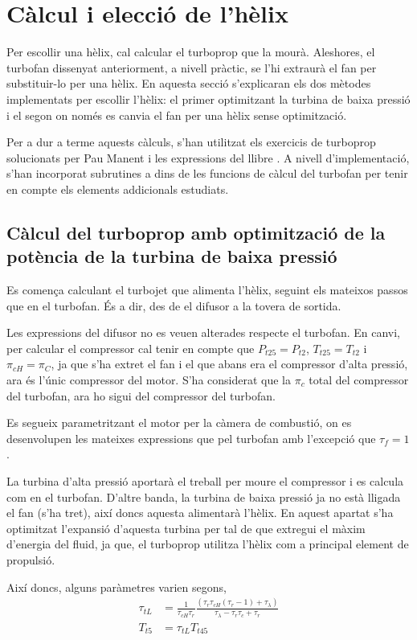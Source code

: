 \clearpage
\section{Càlcul i elecció de l'hèlix}
Per escollir una hèlix, cal calcular el turboprop que la mourà. Aleshores, el turbofan dissenyat anteriorment, a nivell pràctic, se l'hi extraurà el fan per substituir-lo per una hèlix. En aquesta secció s'explicaran els dos mètodes implementats per escollir l'hèlix: el primer optimitzant la turbina de baixa pressió i el segon on només es canvia el fan per una hèlix sense optimització.

\noindent Per a dur a terme aquests càlculs, s'han utilitzat els exercicis de turboprop solucionats per Pau Manent i les expressions del llibre \cite{mattingly}. A nivell d'implementació, s'han incorporat subrutines a dins de les funcions de càlcul del turbofan per tenir en compte els elements addicionals estudiats.

\subsection{Càlcul del turboprop amb optimització de la potència de la turbina de baixa pressió}
Es comença calculant el turbojet que alimenta l'hèlix, seguint els mateixos passos que en el turbofan. És a dir, des de el difusor a la tovera de sortida.

\noindent Les expressions del difusor no es veuen alterades respecte el turbofan. En canvi, per calcular el compressor cal tenir en compte que $P_{t25}=P_{t2}$, $T_{t25}=T_{t2}$ i $\pi_{cH}=\pi_{C}$, ja que s'ha extret el fan i el que abans era el compressor d'alta pressió, ara és l'únic compressor del motor. S'ha considerat que la $\pi_c$ total del compressor del turbofan, ara ho sigui del compressor del turbofan.

\noindent Es segueix parametritzant el motor per la càmera de combustió, on es desenvolupen les mateixes expressions que pel turbofan amb l'excepció que $\tau_f=1$.

\noindent La turbina d'alta pressió aportarà el treball per moure el compressor i es calcula com en el turbofan. D'altre banda, la turbina de baixa pressió ja no està lligada el fan (s'ha tret), així doncs aquesta alimentarà l'hèlix. En aquest apartat s'ha optimitzat l'expansió d'aquesta turbina per tal de que extregui el màxim d'energia del fluid, ja que, el turboprop utilitza l'hèlix com a principal element de propulsió. 

\noindent Així doncs, alguns paràmetres varien segons,
\begin{align}
	\tau_{tL}&=\frac{1}{\tau_{cH}\tau_r}\frac{(\tau_r\tau_{cH}(\tau_r-1)+\tau_\lambda)}{\tau_\lambda-\tau_r\tau_{c}+\tau_r}\\
	T_{t5}&=\tau_{tL}T_{t45}
\end{align}

